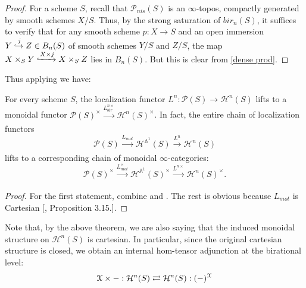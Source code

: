 \begin{proof}
    For a scheme $S$, recall that $\mathcal{P}_{nis}(S)$ is an $\infty$-topos, compactly generated by smooth schemes $X/S$. Thus, by the strong saturation of $bir_n(S)$, it suffices to verify that for any smooth scheme $p:X \to S$ and an open immersion $Y\xhookrightarrow{j} Z\in B_ n(S)$ of smooth schemes $Y/S$ and $Z/S$, the map $X\times_S Y\xhookrightarrow{X\times j}X\times_S Z$ lies in $B_n(S)$. But this is clear from \cref{dense prod}.
\end{proof}
Thus applying  we have:
\begin{thm}\label{Ln is cart}
    For every scheme $S$, the localization functor $L^n: \mathcal{P}(S)\to \mathcal{H}^{n}(S)$ lifts to a monoidal functor $\mathcal{P}(S)^{\times}\xrightarrow[]{L_{bir}^{n\times}} \mathcal{H}^{n}(S)^\times$. In fact, the entire chain of localization functors $$\mathcal{P}(S)\xrightarrow[]{L_{mot}} \mathcal{H}^{\mathbb{A}^1}(S)\xrightarrow[]{L^n} \mathcal{H}^{n}(S)$$ lifts to a corresponding chain of monoidal $\infty$-categories: $$\mathcal{P}(S)^{\times}\xrightarrow[]{L_{mot}^\times } \mathcal{H}^{\mathbb{A}^1}(S)^\times\xrightarrow[]{L^{n\times}} \mathcal{H}^{n}(S)^\times.$$
    \end{thm}
\begin{proof}
    For the first statement, combine  and . The rest is obvious because $L_{mot}$ is Cartesian [\cite{hoyois2017six}, Proposition 3.15.]. 
\end{proof}

Note that, by the above theorem, we are also saying that the induced monoidal structure on $\mathcal{H}^n(S)$ is cartesian. In particular, since the original cartesian structure is closed, we obtain an internal hom-tensor adjunction at the birational level: $$\EuScript{X}\times-:\mathcal{H}^{n}(S)\rightleftarrows\mathcal{H}^{n}(S): (-)^{\EuScript{X}}$$

